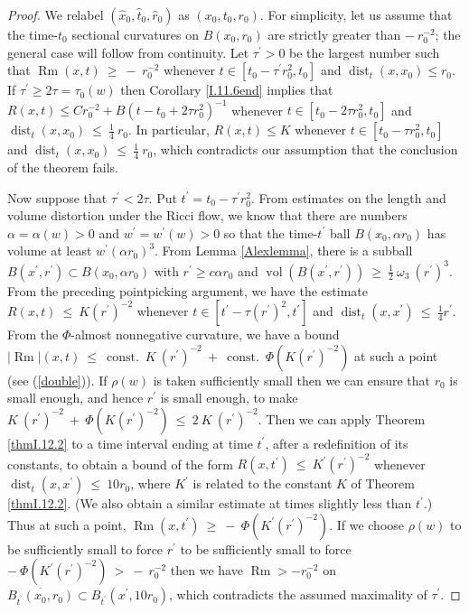 \documentclass[12pt]{amsart}
\newcommand{\const}{\operatorname{const.}}
\newcommand{\dist}{\operatorname{dist}}
\newcommand{\Rm}{\operatorname{Rm}}
\newcommand{\vol}{\operatorname{vol}}
\numberwithin{equation}{section}
\theoremstyle{plain}
\theoremstyle{definition}
\theoremstyle{remark}
\begin{document}
\begin{proof}
We relabel $(\widehat{x}_0, \widehat{t}_0, \widehat{r}_0)$ as
$({x}_0, {t}_0, {r}_0)$.
For simplicity, let us assume that
the time-$t_0$ sectional curvatures on $B(x_0, r_0)$ are strictly
greater than
$- \: r_0^{-2}$; the general case will follow from continuity.
Let $\tau^\prime > 0$ be the largest number such that
$\Rm(x,t) \: \ge \: -\: r_0^{-2}$ whenever
$t \in [t_0 - \tau^\prime r_0^2, t_0]$ and $\dist_t(x, x_0) \le r_0$.
If $\tau^\prime \ge 2 \tau = \tau_0(w)$ then Corollary
\ref{I.11.6end} implies that
$R(x,t) \le C r_0^{-2} + B (t-t_0+ 2 \tau r_0^2)^{-1}$ whenever
$t \in [t_0 - 2 \tau r_0^2, t_0]$ and 
$\dist_t(x, x_0) \: \le \: \frac14 \: r_0$.
In particular, $R(x,t) \le K$ whenever 
$t \in [t_0 - \tau r_0^2, t_0]$ and 
$\dist_t(x, x_0) \: \le \: \frac14 \: r_0$, which contradicts our
assumption that the conclusion of the theorem fails.

Now suppose that $\tau^\prime < 2 \tau$. Put
$t^\prime = t_0 - \tau^\prime r_0^2$.
From estimates on
the length and volume distortion under the Ricci flow, we know that
there are numbers $\alpha = \alpha(w) > 0$ and
$w^\prime = w^\prime(w) > 0$ so that the time-$t^\prime$ ball
$B(x_0, \alpha r_0)$ has volume at least $w^\prime (\alpha r_0)^3$.
From Lemma \ref{Alexlemma}, there is a subball
$B(x^\prime, r^\prime) \subset B(x_0, \alpha r_0)$ with
$r^\prime \ge c \alpha r_0$ and $\vol(B(x^\prime, r^\prime)) \: \ge \:
\frac12 \: \omega_3 \: (r^\prime)^3$. From the preceding
pointpicking argument, we have the estimate $R(x,t) \: \le \: K
(r^\prime)^{-2}$ whenever $t \in [t^\prime - \tau (r^\prime)^2,
t^\prime]$ and $\dist_t(x, x^\prime) \: \le \: \frac14 r^\prime$.
From the $\Phi$-almost nonnegative curvature, 
we have a bound 
$|\Rm|(x,t) \: \le \:
\const \: K \: (r^\prime)^{-2} \: + \: \const \: \Phi( K (r^\prime)^{-2})$
at
such a point (see (\ref{double})).  If $\rho(w)$ is taken sufficiently
small then we can ensure that $r_0$ is small enough, and
hence $r^\prime$ is small enough, to make
$K \: (r^\prime)^{-2} \: + \: \Phi( K (r^\prime)^{-2}) \: \le \:
2 \: K \: (r^\prime)^{-2}$.
Then we can apply
Theorem \ref{thmI.12.2} to a time interval ending at time
$t^\prime$, after a redefinition of its
constants, to obtain a bound of the form
$R(x, t^\prime) \: \le \: K^\prime (r^\prime)^{-2}$ 
whenever $\dist_{t}(x, x^\prime) \: \le \: 10 r_0$, where
$K^\prime$ is related to the constant 
$K$ of Theorem \ref{thmI.12.2}. (We also obtain a similar estimate at
times slightly less than $t^\prime$.)  Thus at such a point,
$\Rm(x, t^\prime) \: \ge \: - \: 
\Phi(K^\prime (r^\prime)^{-2})$.  If we choose $\rho(w)$ to be
sufficiently small to force $r^\prime$ to be sufficiently small to force
$- \: 
\Phi(K^\prime (r^\prime)^{-2})\: > \: - \: r_0^{-2}$
then we have
$\Rm > - r_0^{-2}$ on $\overline{B_{t^\prime}(x_0, r_0)} \subset
B_{t^\prime}(x^\prime, 10r_0)$, which 
contradicts the assumed maximality of $\tau^\prime$.


\end{proof}
\end{document}
